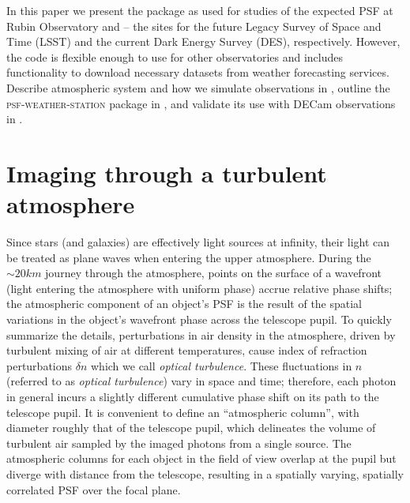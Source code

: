 \documentclass[twocolumn]{aastex631}
\newcommand{\psfws}{\textsc{psf-weather-station}\xspace}
\begin{document}
In this paper we present the package as used for studies of the expected PSF at Rubin Observatory and  -- the sites for the future Legacy Survey of Space and Time (LSST) and the current Dark Energy Survey (DES), respectively. However, the code is flexible enough to use for other observatories and includes functionality to download necessary datasets from weather forecasting services.
Describe atmospheric system and how we simulate observations in , outline the \psfws package in , and validate its use with DECam observations in .


\section{Imaging through a turbulent atmosphere} \label{sec:atmos}
Since stars (and galaxies) are effectively light sources at infinity, their light can be treated as plane waves when entering the upper atmosphere. 
During the $\sim20\unit{km}$ journey through the atmosphere, points on the surface of a wavefront (light entering the atmosphere with uniform phase) accrue relative phase shifts; the atmospheric component of an object's PSF is the result of the spatial variations in the object's wavefront phase across the telescope pupil.
To quickly summarize the details, perturbations in air density in the atmosphere, driven by turbulent mixing of air at different temperatures, cause index of refraction perturbations $\delta n$ \citep{lawrence_survey_1970, clifford_classical_1978} which we call \textit{optical turbulence}.
These fluctuations in $n$ (referred to as \textit{optical turbulence}) vary in space and time; therefore, each photon in general incurs a slightly different cumulative phase shift on its path to the telescope pupil.
It is convenient to define an ``atmospheric column'', with diameter roughly that of the telescope pupil, which delineates the volume of turbulent air sampled by the imaged photons from a single source. 
The atmospheric columns for each object in the field of view overlap at the pupil but diverge with distance from the telescope, resulting in a spatially varying, spatially correlated PSF over the focal plane. 
\end{document}
